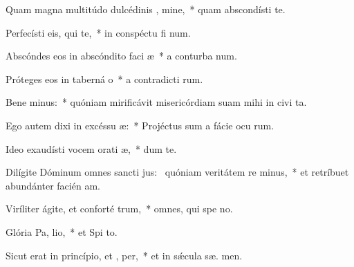 \item Quam magna multitúdo dulcédinis , mine,~* quam abscondísti  te.
\item Perfecísti eis, qui   te,~* in conspéctu fi num.
\item Abscóndes eos in abscóndito faci æ~* a conturba num.
\item Próteges eos in taberná o~* a contradicti rum.
\item Bene minus:~* quóniam mirificávit misericórdiam suam mihi in civi ta.
\item Ego autem dixi in excéssu  æ:~* Projéctus sum a fácie ocu rum.
\item Ideo exaudísti vocem orati æ,~* dum   te.
\item Dilígite Dóminum omnes sancti jus:~\pscross{} quóniam veritátem re minus,~* et retríbuet abundánter facién am.
\item Viríliter ágite, et conforté  trum,~* omnes, qui spe  no.
\item Glória Pa,  lio,~* et Spi to.
\item Sicut erat in princípio, et ,  per,~* et in sǽcula sæ. men.

